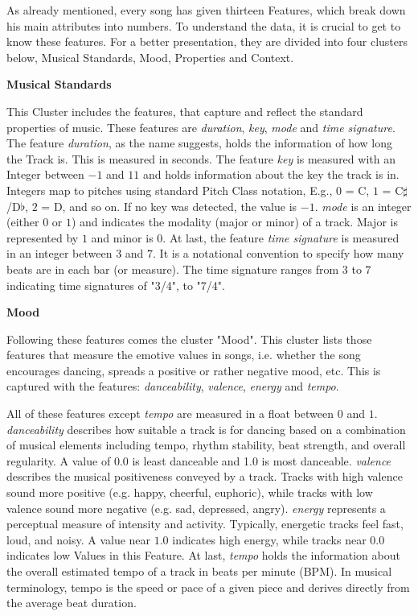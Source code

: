 As already mentioned, every song has given thirteen Features, which break down his main attributes into numbers.
To understand the data, it is crucial to get to know these features.
For a better presentation, they are divided into four clusters below, 
Musical Standards, Mood, Properties and Context.

\textbf{Musical Standards}

This Cluster includes the features, that capture and reflect the standard properties of music. 
These features are \emph{duration}, \emph{key}, \emph{mode} and \emph{time signature}. 
The feature \emph{duration}, as the name suggests, holds the information of how long the Track is.
This is measured in seconds. The feature \emph{key} is measured with an Integer between \(-1\) and \(11\) and 
holds information about the key the track is in. Integers map to pitches using standard Pitch Class notation, E.g., \(0\) = C, \(1\) = C\(\sharp\) /D\(\flat\), \(2\) = D, and so on. 
If no key was detected, the value is \(-1\).
\emph{mode} is an integer (either \(0\) or \(1\)) and indicates the modality (major or minor) of a track. Major is represented by \(1\) and minor is \(0\). 
At last, the feature \emph{time signature} is measured in an integer between \(3\) and \(7\).
It is a notational convention to specify how many beats are in each bar (or measure). 
The time signature ranges from \(3\) to \(7\) indicating time signatures of "3/4", to "7/4".

\textbf{Mood}

Following these features comes the cluster "Mood".
This cluster lists those features that measure the emotive values in songs, 
i.e. whether the song encourages dancing, spreads a positive or rather negative mood,
etc. This is captured with the features: \emph{danceability}, \emph{valence}, \emph{energy} and \emph{tempo}.

All of these features except \emph{tempo} are measured in a float between \(0\) and \(1\). 
\emph{danceability} describes how suitable a track is for dancing based on a combination of musical elements
including tempo, rhythm stability, beat strength, and overall regularity. A value of \(0.0\) is least danceable and 1.0 is most danceable.
\emph{valence} describes the musical positiveness conveyed by a track. 
Tracks with high valence sound more positive (e.g. happy, cheerful, euphoric),
while tracks with low valence sound more negative (e.g. sad, depressed, angry).  
\emph{energy} represents a perceptual measure of intensity and activity. Typically, energetic tracks feel fast, loud, and noisy. 
A value near \(1.0\) indicates high energy, while tracks near \(0.0\) indicates low Values in this Feature. 
At last, \emph{tempo} holds the information about the overall estimated tempo of a track in beats per
minute (BPM). In musical terminology, tempo is the speed or pace of a given piece and derives directly from the
average beat duration.

